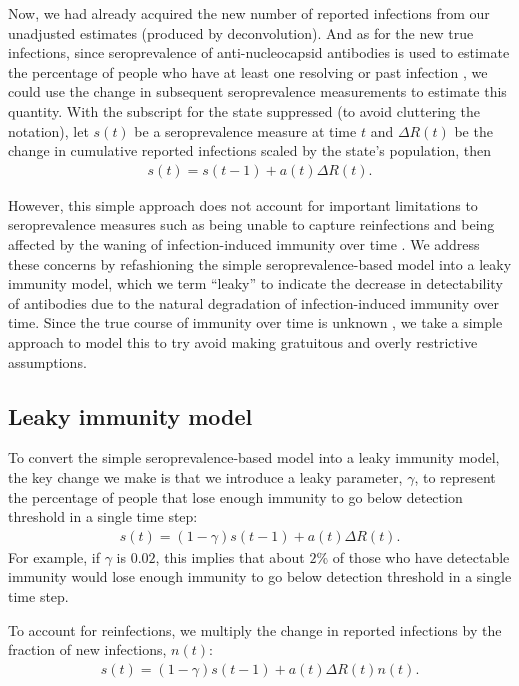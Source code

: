 \documentclass{article}
\begin{document}
Now, we had already acquired the new number of reported infections from our unadjusted estimates (produced by deconvolution). And as for the new true infections, since seroprevalence of anti-nucleocapsid antibodies is used to estimate the percentage of people who have at least one resolving or past infection \citep{cdc2020data}, we could use the change in subsequent seroprevalence measurements to estimate this quantity. With the subscript for the state suppressed (to avoid cluttering the notation), let $s(t)$ be a seroprevalence measure at time $t$ and $\Delta R(t)$ be the change in cumulative reported infections scaled by the state’s population, then 
\begin{align*}
    s(t) = s(t-1) + a(t)\Delta R(t).
\end{align*}

However, this simple approach does not account for important limitations to seroprevalence measures such as being unable to capture reinfections \citep{cdc2020data} and being affected by the waning of infection-induced immunity over time \citep{seow2020longitudinal, ibarrondo2020rapid}. We address these concerns by refashioning the simple seroprevalence-based model into a leaky immunity model, which we term ``leaky'' to indicate the decrease in detectability of antibodies due to the natural degradation of infection-induced immunity over time. Since the true course of immunity over time is unknown \citep{goldberg2022protection}, we take a simple approach to model this to try avoid making gratuitous and overly restrictive assumptions.

\subsection{Leaky immunity model} To convert the simple seroprevalence-based model into a leaky immunity model, the key change we make is that we introduce a leaky parameter, $\gamma$, to represent the percentage of people that lose enough immunity to go below detection threshold in a single time step:
\begin{align*}
s(t) = (1 -\gamma)s(t-1) + a(t)\Delta R(t). %
\end{align*}
For example, if $\gamma$ is $0.02$, this implies that about $2\%$ of those who have detectable immunity would lose enough immunity to go below detection threshold in a single time step.

To account for reinfections, we multiply the change in reported infections by the fraction of new infections, $n(t)$:
\begin{align*}
s(t) = (1 -\gamma)s(t-1) + a(t)\Delta R(t)n(t).
\end{align*}
\end{document}
